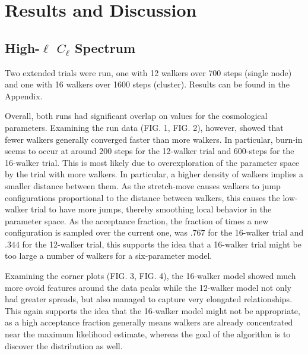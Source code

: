 \documentclass[aps,prd,final,twocolumn]{revtex4}
\begin{document}
\section{Results and Discussion \label{sec:expanls} }

\subsection{High-$\ell$ $C_\ell$ Spectrum}

Two extended trials were run, one with 12 walkers over 700 steps (single node) and one with 16 walkers over 1600 steps (cluster). Results can be found in the Appendix.

Overall, both runs had significant overlap on values for the cosmological parameters. Examining the run data (FIG. 1, FIG. 2), however, showed that fewer walkers generally converged faster than more walkers. In particular, burn-in seems to occur at around 200 steps for the 12-walker trial and 600-steps for the 16-walker trial. This is most likely due to  overexploration of the parameter space by the trial with more walkers. In particular, a higher density of walkers implies a smaller distance between them. As the stretch-move causes walkers to jump configurations proportional to the distance between walkers, this causes the low-walker trial to have more jumps, thereby smoothing local behavior in the parameter space. As the acceptance fraction, the fraction of times a new configuration is sampled over the current one, was $.767$ for the 16-walker trial and $.344$ for the 12-walker trial, this supports the idea that a 16-walker trial might be too large a number of walkers for a six-parameter model.

Examining the corner plots (FIG. 3, FIG. 4), the 16-walker model showed much more ovoid features around the data peaks while the 12-walker model not only had greater spreads, but also managed to capture very elongated relationships. This again supports the idea that the 16-walker model might not be appropriate, as a high acceptance fraction generally means walkers are already concentrated near the maximum likelihood estimate, whereas the goal of the algorithm is to discover the distribution as well. 
\end{document}
